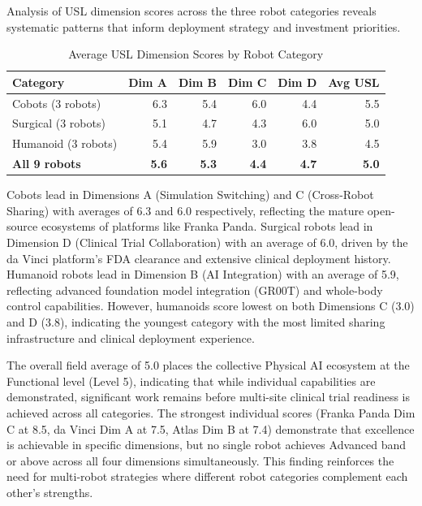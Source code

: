Analysis of USL dimension scores across the three robot categories reveals
systematic patterns that inform deployment strategy and investment priorities.

\begin{table}[H]
\centering
\caption{Average USL Dimension Scores by Robot Category}
\label{tab:dim-averages}
\small
\begin{tabular}{l r r r r r}
\toprule
\textbf{Category} & \textbf{Dim A} & \textbf{Dim B} & \textbf{Dim C} & \textbf{Dim D} & \textbf{Avg USL} \\
\midrule
Cobots (3 robots) & 6.3 & 5.4 & 6.0 & 4.4 & 5.5 \\
Surgical (3 robots) & 5.1 & 4.7 & 4.3 & 6.0 & 5.0 \\
Humanoid (3 robots) & 5.4 & 5.9 & 3.0 & 3.8 & 4.5 \\
\midrule
\textbf{All 9 robots} & \textbf{5.6} & \textbf{5.3} & \textbf{4.4} & \textbf{4.7} & \textbf{5.0} \\
\bottomrule
\end{tabular}
\end{table}

Cobots lead in Dimensions A (Simulation Switching) and C (Cross-Robot Sharing)
with averages of 6.3 and 6.0 respectively, reflecting the mature open-source
ecosystems of platforms like Franka Panda. Surgical robots lead in Dimension D
(Clinical Trial Collaboration) with an average of 6.0, driven by the da Vinci
platform's FDA clearance and extensive clinical deployment history. Humanoid
robots lead in Dimension B (AI Integration) with an average of 5.9, reflecting
advanced foundation model integration (GR00T) and whole-body control
capabilities. However, humanoids score lowest on both Dimensions C (3.0) and D
(3.8), indicating the youngest category with the most limited sharing
infrastructure and clinical deployment experience.

The overall field average of 5.0 places the collective Physical AI ecosystem at
the Functional level (Level 5), indicating that while individual capabilities
are demonstrated, significant work remains before multi-site clinical trial
readiness is achieved across all categories. The strongest individual scores
(Franka Panda Dim C at 8.5, da Vinci Dim A at 7.5, Atlas Dim B at 7.4)
demonstrate that excellence is achievable in specific dimensions, but no single
robot achieves Advanced band or above across all four dimensions
simultaneously. This finding reinforces the need for multi-robot strategies
where different robot categories complement each other's strengths.

